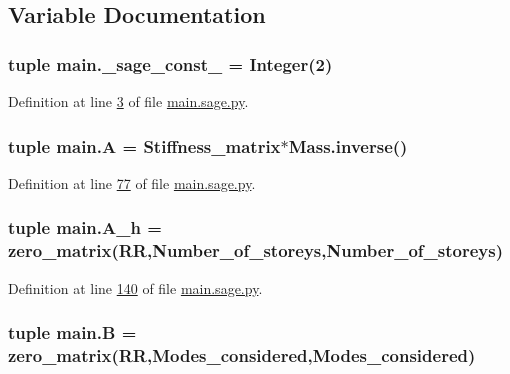 \subsection{Variable Documentation}
\hypertarget{namespacemain_ad85d7913c0e40b9e1f30e64611a0fafa}{}
\subsubsection[{\+\_\+sage\+\_\+const\+\_\+2}]{\setlength{\rightskip}{0pt plus 5cm}tuple main.\+\_\+sage\+\_\+const\+\_ = Integer(2)}\label{namespacemain_ad85d7913c0e40b9e1f30e64611a0fafa}


Definition at line \hyperlink{main_8sage_8py_source_l00003}{3} of file \hyperlink{main_8sage_8py_source}{main.\+sage.\+py}.

\hypertarget{namespacemain_ad101f166a53497f04b37636bcadbfe65}{}
\subsubsection[{A}]{\setlength{\rightskip}{0pt plus 5cm}tuple main.\+A = {\bf Stiffness\+\_\+matrix}$\ast$Mass.\+inverse()}\label{namespacemain_ad101f166a53497f04b37636bcadbfe65}


Definition at line \hyperlink{main_8sage_8py_source_l00077}{77} of file \hyperlink{main_8sage_8py_source}{main.\+sage.\+py}.

\hypertarget{namespacemain_a49b10c1530f56b101c4cc17b20fb1973}{}
\subsubsection[{A\+\_\+h}]{\setlength{\rightskip}{0pt plus 5cm}tuple main.\+A\+\_\+h = zero\+\_\+matrix(R\+R,Number\+\_\+of\+\_\+storeys,Number\+\_\+of\+\_\+storeys)}\label{namespacemain_a49b10c1530f56b101c4cc17b20fb1973}


Definition at line \hyperlink{main_8sage_8py_source_l00140}{140} of file \hyperlink{main_8sage_8py_source}{main.\+sage.\+py}.

\hypertarget{namespacemain_a6ae8768d11174f5baf9febc5244d6f06}{}
\subsubsection[{B}]{\setlength{\rightskip}{0pt plus 5cm}tuple main.\+B = zero\+\_\+matrix(R\+R,{\bf Modes\+\_\+considered},{\bf Modes\+\_\+considered})}\label{namespacemain_a6ae8768d11174f5baf9febc5244d6f06}


